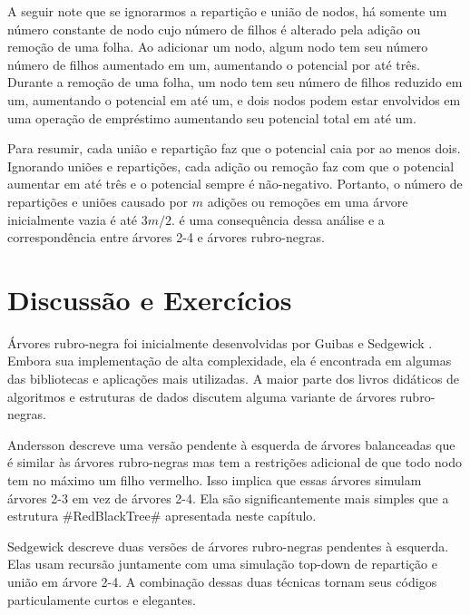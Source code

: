 A seguir note que se ignorarmos a repartição e união de nodos, há somente
um número constante de nodo cujo número de filhos é alterado pela adição
ou remoção de uma folha. Ao adicionar um nodo, algum nodo tem seu número
número de filhos aumentado em um, aumentando o potencial por até três.
Durante a remoção de uma folha, um nodo tem seu número de filhos reduzido
em um, aumentando o potencial em até um, e dois nodos podem estar envolvidos em
uma operação de empréstimo aumentando seu potencial total em até um.

Para resumir, cada união e repartição faz que o potencial caia por ao menos dois.
Ignorando uniões e repartições, cada adição ou remoção faz com que o potencial aumentar em até três e o potencial sempre é não-negativo.
Portanto, o número de repartições e uniões causado por $m$
adições ou remoções em uma árvore inicialmente vazia é até 
$3m/2$.
 é uma consequência dessa análise e a correspondência entre árvores 2-4 e árvores rubro-negras.

\section{Discussão e Exercícios}

Árvores rubro-negra foi inicialmente desenvolvidas por Guibas e Sedgewick \cite{gs78}.
Embora sua implementação de alta complexidade, ela é encontrada em algumas
das bibliotecas e aplicações mais utilizadas. A maior parte dos livros didáticos
de algoritmos e estruturas de dados discutem alguma variante de 
árvores rubro-negras.

Andersson \cite{a93} descreve uma versão pendente à esquerda de árvores balanceadas que é similar às 
árvores rubro-negras mas tem a restrições adicional de que todo nodo tem no máximo um filho vermelho. Isso implica que essas árvores simulam árvores 2-3 em vez de árvores 2-4. Ela são significantemente mais simples que a estrutura 
#RedBlackTree# apresentada neste capítulo.

Sedgewick \cite{s08} descreve duas versões de árvores rubro-negras pendentes à esquerda. Elas usam recursão juntamente com uma simulação top-down de repartição e união em árvore 2-4. A combinação dessas duas técnicas tornam seus códigos particulamente curtos e elegantes.

